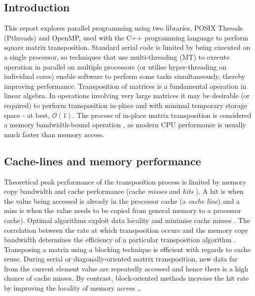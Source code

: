 \documentclass[10 pt, conference]{cssconf}
\begin{document}
\begin{multicols}{2}
\section{Introduction}
 This report explores parallel programming using two libraries, POSIX Threads (Pthreads) and OpenMP, used with the C++ programming language to perform square matrix transposition. Standard serial code is limited by being executed on a single processor, so techniques that use multi-threading (MT) to execute operation in parallel on multiple processors (or utilise hyper-threading on individual cores) enable software to perform some tasks simultaneously, thereby improving performance.
 Transposition of matrices is a fundamental operation in linear algebra. In operations involving very large matrices it may be desirable (or required) to perform transposition in-place and with minimal temporary storage space - at best, $\mathcal{O}(1)$. The process of in-place matrix transposition is considered a memory bandwidth-bound operation \cite{ramachandran1999algorithmic}, as modern CPU performance is usually much faster than memory access.
 
 \subsection{Cache-lines and memory performance}
 Theoretical peak performance of the transposition process is limited by memory copy bandwidth and cache performance (cache \textit{misses} and \textit{hits} \cite{frigo2012cache}). A hit is when the value being accessed is already in the processor cache (a \textit{cache line}) and a miss is when the value needs to be copied from general memory to a processor cache). Optimal algorithms exploit data locality and minimise cache misses \cite{Cache:URL}. The correlation between the rate at which transposition occurs and the memory copy bandwidth determines the efficiency of a particular transposition algorithm \cite{frigo2012cache}.
Transposing a matrix using a blocking technique is efficient with regards to cache reuse. During serial or diagonally-oriented matrix transposition, new data far from the current element value are repeatedly accessed and hence there is a high chance of cache misses. By contrast, block-oriented methods increase the hit rate by improving the locality of memory access \cite{ramachandran1999algorithmic},\cite{Cache:URL}.


\end{multicols}
\end{document}
